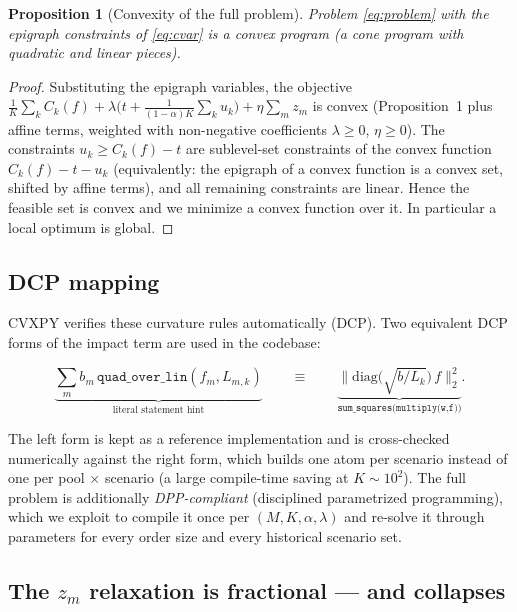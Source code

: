 \documentclass[11pt,a4paper]{article}
\newtheorem{proposition}{Proposition}
\theoremstyle{remark}
\begin{document}
\begin{proposition}[Convexity of the full problem]
Problem \eqref{eq:problem} with the epigraph constraints of \eqref{eq:cvar} is a convex
program (a cone program with quadratic and linear pieces).
\end{proposition}

\begin{proof}
Substituting the epigraph variables, the objective
$\frac{1}{K}\sum_k C_k(f) + \lambda\big(t + \frac{1}{(1-\alpha)K}\sum_k u_k\big)
+ \eta\sum_m z_m$ is convex (Proposition~1 plus affine terms, weighted with non-negative
coefficients $\lambda\ge0$, $\eta\ge0$).  The constraints $u_k \ge C_k(f)-t$ are
sublevel-set constraints of the convex function $C_k(f)-t-u_k$ (equivalently: the epigraph
of a convex function is a convex set, shifted by affine terms), and all remaining
constraints are linear.  Hence the feasible set is convex and we minimize a convex function
over it.  In particular a local optimum is global.
\end{proof}

\subsection*{DCP mapping}

CVXPY verifies these curvature rules automatically (DCP).  Two equivalent DCP forms of the
impact term are used in the codebase:

\[
  \underbrace{\sum_{m} b_m\,
  \texttt{quad\_over\_lin}(f_m, L_{m,k})}_{\text{literal statement hint}}
  \qquad\equiv\qquad
  \underbrace{\big\|\mathrm{diag}\big(\sqrt{b/L_{k}}\big)\,f\big\|_{2}^{2}}_{\texttt{sum\_squares(multiply(w,f))}} .
\]

The left form is kept as a reference implementation and is cross-checked numerically against
the right form, which builds one atom per scenario instead of one per pool $\times$ scenario
(a large compile-time saving at $K\sim10^{2}$).  The full problem is additionally
\emph{DPP-compliant} (disciplined parametrized programming), which we exploit to compile it
once per $(M,K,\alpha,\lambda)$ and re-solve it through parameters for every order size and
every historical scenario set.

\subsection{The $z_m$ relaxation is fractional --- and collapses}
\label{sec:relaxation}
\end{document}
